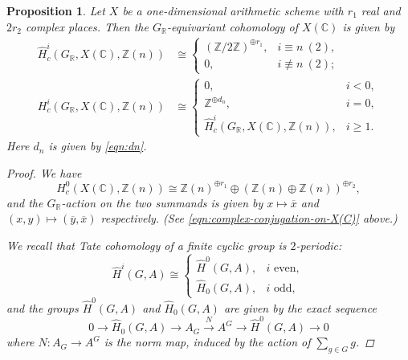 \documentclass[draft]{article}
\newcommand{\CC}{\mathbb{C}}
\newcommand{\RR}{\mathbb{R}}
\newcommand{\ZZ}{\mathbb{Z}}
\theoremstyle{myplain}
\newtheorem{proposition}[theorem]{Proposition}
\theoremstyle{mydefinition}
\numberwithin{equation}{section}
\begin{document}
\begin{proposition}
  Let $X$ be a one-dimensional arithmetic scheme with $r_1$ real and $2r_2$
  complex places. Then the $G_\RR$-equivariant cohomology of $X(\CC)$ is given
  by
  \begin{align*}
    \widehat{H}^i_c (G_\RR, X(\CC), \ZZ (n)) & \cong
                                              \begin{cases}
                                                (\ZZ/2\ZZ)^{\oplus r_1}, & i \equiv n ~ (2), \\
                                                0, & i \not\equiv n ~ (2);
                                              \end{cases} \\
    H^i_c (G_\RR, X(\CC), \ZZ (n)) & \cong
                                    \begin{cases}
                                      0, & i < 0, \\
                                      \ZZ^{\oplus d_n}, & i = 0, \\
                                      \widehat{H}^i_c (G_\RR, X(\CC), \ZZ (n)), & i \ge 1.
                                    \end{cases}
  \end{align*}
  Here $d_n$ is given by \eqref{eqn:dn}.

  \begin{proof}
    We have
    \[ H^0_c (X(\CC), \ZZ(n)) \cong
      \ZZ (n)^{\oplus r_1} \oplus (\ZZ (n) \oplus \ZZ (n))^{\oplus r_2}, \]
    and the $G_\RR$-action on the two summands is given by
    $x \mapsto \overline{x}$ and $(x,y) \mapsto (\overline{y}, \overline{x})$
    respectively. (See \eqref{eqn:complex-conjugation-on-X(C)} above.)

    We recall that Tate cohomology of a finite cyclic group is $2$-periodic:
    \[ \widehat{H}^i (G,A) \cong
      \begin{cases}
        \widehat{H}^0 (G,A), & i\text{ even}, \\
        \widehat{H}_0 (G,A), & i\text{ odd},
      \end{cases} \]
    and the groups $\widehat{H}^0 (G,A)$ and $\widehat{H}_0 (G,A)$ are given by
    the exact sequence
    \[ 0 \to \widehat{H}_0 (G,A) \to
      A_G \xrightarrow{N} A^G \to
      \widehat{H}^0 (G,A) \to 0 \]
    where $N\colon A_G\to A^G$ is the norm map, induced by the action of
    $\sum_{g\in G} g$.

    \vspace{1em}


\end{proof}
\end{proposition}
\end{document}
